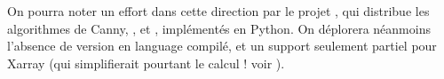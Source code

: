 On pourra noter un effort dans cette direction par le projet , qui distribue les algorithmes de Canny, , et , implémentés en Python.
On déplorera néanmoins l'absence de version en language compilé, et un support seulement partiel pour Xarray (qui simplifierait pourtant le calcul ! voir ).




